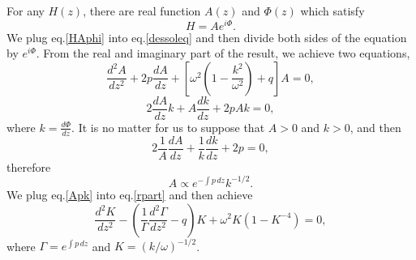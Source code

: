 \documentclass[
 jor,
 amsmath,amssymb,preprint,
]{revtex4-2}
\begin{document}
For any $H(z)$, there are real function $A(z)$ and $\Phi(z)$ which satisfy
\begin{equation}\label{HAphi}
    H=Ae^{i\Phi}.
\end{equation}
We plug eq.\eqref{HAphi} into eq.\eqref{dessoleq} and then divide both sides of the equation by $e^{i\Phi}$. From the real and imaginary part of the result, we achieve two equations,
\begin{equation}\label{rpart}
    \frac{d^2 A}{d z^2}+2p\frac{d A}{d z}+\left[\omega^2\left(1-\frac{k^2}{\omega^2}\right)+q\right]A=0,
\end{equation}
\begin{equation}\label{ipart}
    2\frac{d A}{d z}k+A\frac{d k}{d z}+2pAk=0,
\end{equation}
where $k=\frac{d \Phi}{d z}$. It is no matter for us to suppose that $A>0$ and $k>0$, and then
\begin{equation}
    2\frac{1}{A}\frac{d A}{d z}+\frac{1}{k}\frac{d k}{d z}+2p=0,
\end{equation}
therefore
\begin{equation}\label{Apk}
    A\propto e^{-\int p\,dz}k^{-1/2}.
\end{equation}
We plug eq.\eqref{Apk} into eq.\eqref{rpart} and then achieve
\begin{equation}
    \frac{d^2 K}{d z^2}-\left(\frac{1}{\Gamma}\frac{d^2\Gamma}{d z^2}-q\right)K+\omega^2K(1-K^{-4})=0,
\end{equation}
where $\Gamma=e^{\int p \,dz}$ and $K=(k/\omega)^{-1/2}$.
\end{document}
